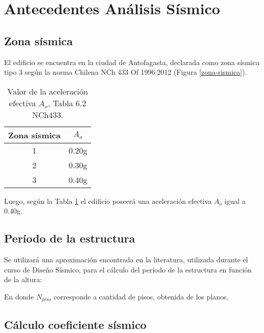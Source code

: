 \newpage
\section{Antecedentes Análisis Sísmico}

\subsection{Zona sísmica}

El edificio se encuentra en la ciudad de Antofagasta, declarada como zona sísmica tipo 3 según la norma Chilena NCh 433 Of 1996:2012 (Figura \ref{zona-sismica}).


\begin{table}[H]
  \centering
  \caption{Valor de la aceleración efectiva $A_o$, Tabla 6.2 NCh433.}
    \begin{tabular}{|c|c|}
    \hline
    \textbf{Zona sísmica} & \boldmath{}\textbf{$A_o$}\unboldmath{} \bigstrut\\
    \hline
    1     & 0.20g \bigstrut[t]\\
    2     & 0.30g \\
    3     & 0.40g \bigstrut[b]\\
    \hline
    \end{tabular}%
  \label{tab:zonasismicaAo}%
\end{table}%

Luego, según la Tabla \ref{tab:zonasismicaAo} el edificio poseerá una aceleración efectiva $A_o$ igual a 0.40g.

\subsection{Período de la estructura}

Se utilizará una aproximación encontrada en la literatura, utilizada durante el curso de Diseño Sísmico, para el cálculo del período de la estructura en función de la altura:


En donde $N_{piso}$ corresponde a cantidad de pisos, obtenida de los planos.

\subsection{Cálculo coeficiente sísmico}

